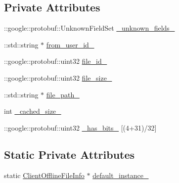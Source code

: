 \subsection*{Private Attributes}
\begin{DoxyCompactItemize}
\item 
\+::google\+::protobuf\+::\+Unknown\+Field\+Set \hyperlink{class_i_m_1_1_base_define_1_1_client_offline_file_info_ac7181ff9b8c6f1955727c52b213adb18}{\+\_\+unknown\+\_\+fields\+\_\+}
\item 
\+::std\+::string $\ast$ \hyperlink{class_i_m_1_1_base_define_1_1_client_offline_file_info_a0735eac1cc455c54bd8c7695990f1294}{from\+\_\+user\+\_\+id\+\_\+}
\item 
\+::google\+::protobuf\+::uint32 \hyperlink{class_i_m_1_1_base_define_1_1_client_offline_file_info_af33bd81b3e8c5fe483809e812677260e}{file\+\_\+id\+\_\+}
\item 
\+::google\+::protobuf\+::uint32 \hyperlink{class_i_m_1_1_base_define_1_1_client_offline_file_info_a666b5b063bf0ecb81fae1073f938aede}{file\+\_\+size\+\_\+}
\item 
\+::std\+::string $\ast$ \hyperlink{class_i_m_1_1_base_define_1_1_client_offline_file_info_ae8c507d474958baa22a964b603c98247}{file\+\_\+path\+\_\+}
\item 
int \hyperlink{class_i_m_1_1_base_define_1_1_client_offline_file_info_a643992efc1441f78263f2bc9d28fdf42}{\+\_\+cached\+\_\+size\+\_\+}
\item 
\+::google\+::protobuf\+::uint32 \hyperlink{class_i_m_1_1_base_define_1_1_client_offline_file_info_a5ab583e0e20ab8380bfd3757fff31e1d}{\+\_\+has\+\_\+bits\+\_\+} \mbox{[}(4+31)/32\mbox{]}
\end{DoxyCompactItemize}
\subsection*{Static Private Attributes}
\begin{DoxyCompactItemize}
\item 
static \hyperlink{class_i_m_1_1_base_define_1_1_client_offline_file_info}{Client\+Offline\+File\+Info} $\ast$ \hyperlink{class_i_m_1_1_base_define_1_1_client_offline_file_info_a7080e29ae21b7e8a3030b8bfcb291886}{default\+\_\+instance\+\_\+}
\end{DoxyCompactItemize}
